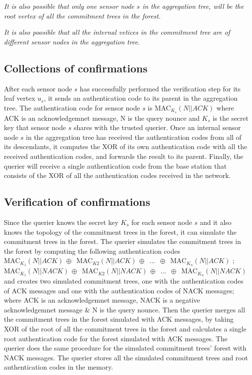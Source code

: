 	\textit{It is also possible that only one sensor node $s$ in the aggregation tree, will be the root vertex of all the commitment trees in the forest.} 

	\textit{It is also poosible that all the internal vetices in the commitment tree are of different sensor nodes in the aggregation tree.}


\subsection{Collections of confirmations}
After each sensor node $s$ has successfully performed the 
verification step for its leaf vertex $u_{s}$, it sends an 
authentication code to its parent in the aggregation tree.
The authentication code for sensor node $s$ is MAC$_{K_{s}}(N||ACK)$
where ACK is an acknowledgemnet message, N is the query nounce and $K_{s}$ 
is the secret key that sensor node $s$ shares with the trusted querier. Once
an internal sensor node $s$ in the aggregation tree has received the
authentication codes from all of its descendants, it computes the XOR of its 
own authentication code with all the received authentication codes, and 
forwards the result to its parent. Finally, the querier will receive a 
single authentication code from the base station that consists of the XOR of 
all the authentication codes received in the network. 

\subsection{Verification of confirmations}
Since the querier knows the secret key $K_{s}$ for each sensor node $s$ and 
it also knows the topology of the commitment trees in the forest, it can
simulate the commitment trees in the forest. The querier simulates the 
commitment trees in the forest by computing the following authentication 
codes\\
MAC$_{K_{1}}(N||ACK)\,\oplus\,$ 
MAC$_{K2}(N||ACK)\,\oplus\,$
...
$\,\oplus\,$
MAC$_{K_{n}}(N||ACK)$ ; \\
MAC$_{K_{1}}(N||NACK)\,\oplus\,$ 
MAC$_{K2}(N||NACK)\,\oplus\,$
...
$\,\oplus\,$
MAC$_{K_{n}}(N||NACK)$  \\
and creates two simulated commitment trees, one with the authentication codes of ACK messages and one with the authentication codes of NACK messages; where ACK is an acknowledgemnet message, NACK is a negative acknowledgemnet message \& N is the query nounce. Then the querier merges all the commitment trees in the forest simulated with ACK messages, by taking XOR of the root of all the commitment trees in the forest and calculates a single root authentication code for the forest simulated with ACK messages. The querier does the same procedure for the simulated commitment trees' forest with NACK messages. The querier stores all the simulated commitment trees and root authentication codes in the memory. 

